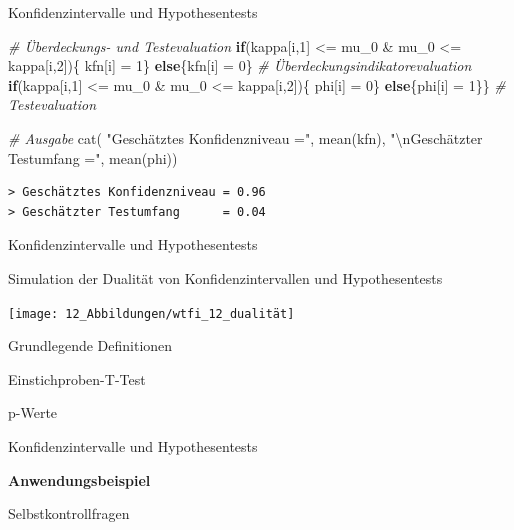 \documentclass[
  8pt,
  ignorenonframetext,
]{beamer}
\newenvironment{Shaded}{\begin{snugshade}}{\end{snugshade}}
\newcommand{\CommentTok}[1]{\textcolor[rgb]{0.56,0.35,0.01}{\textit{#1}}}
\newcommand{\ControlFlowTok}[1]{\textcolor[rgb]{0.13,0.29,0.53}{\textbf{#1}}}
\newcommand{\DecValTok}[1]{\textcolor[rgb]{0.00,0.00,0.81}{#1}}
\newcommand{\FunctionTok}[1]{\textcolor[rgb]{0.00,0.00,0.00}{#1}}
\newcommand{\NormalTok}[1]{#1}
\newcommand{\OtherTok}[1]{\textcolor[rgb]{0.56,0.35,0.01}{#1}}
\newcommand{\SpecialCharTok}[1]{\textcolor[rgb]{0.00,0.00,0.00}{#1}}
\newcommand{\StringTok}[1]{\textcolor[rgb]{0.31,0.60,0.02}{#1}}
\begin{document}
\begin{frame}[fragile]{Konfidenzintervalle und Hypothesentests}
\begin{Shaded}
\begin{Highlighting}[]
  \CommentTok{\# Überdeckungs{-} und Testevaluation}
  \ControlFlowTok{if}\NormalTok{(kappa[i,}\DecValTok{1}\NormalTok{] }\SpecialCharTok{\textless{}=}\NormalTok{ mu\_0 }\SpecialCharTok{\&}\NormalTok{ mu\_0 }\SpecialCharTok{\textless{}=}\NormalTok{ kappa[i,}\DecValTok{2}\NormalTok{])\{}
\NormalTok{      kfn[i] }\OtherTok{=} \DecValTok{1}\NormalTok{\} }\ControlFlowTok{else}\NormalTok{\{kfn[i] }\OtherTok{=} \DecValTok{0}\NormalTok{\}                    }\CommentTok{\# Überdeckungsindikatorevaluation}
  \ControlFlowTok{if}\NormalTok{(kappa[i,}\DecValTok{1}\NormalTok{] }\SpecialCharTok{\textless{}=}\NormalTok{ mu\_0 }\SpecialCharTok{\&}\NormalTok{ mu\_0 }\SpecialCharTok{\textless{}=}\NormalTok{ kappa[i,}\DecValTok{2}\NormalTok{])\{}
\NormalTok{      phi[i] }\OtherTok{=} \DecValTok{0}\NormalTok{\} }\ControlFlowTok{else}\NormalTok{\{phi[i] }\OtherTok{=} \DecValTok{1}\NormalTok{\}\}                    }\CommentTok{\# Testevaluation}

\CommentTok{\# Ausgabe}
\FunctionTok{cat}\NormalTok{(   }\StringTok{"Geschätztes Konfidenzniveau ="}\NormalTok{, }\FunctionTok{mean}\NormalTok{(kfn),}
     \StringTok{"}\SpecialCharTok{\textbackslash{}n}\StringTok{Geschätzter Testumfang      ="}\NormalTok{, }\FunctionTok{mean}\NormalTok{(phi))}
\end{Highlighting}
\end{Shaded}

\begin{verbatim}
> Geschätztes Konfidenzniveau = 0.96 
> Geschätzter Testumfang      = 0.04
\end{verbatim}
\end{frame}

\begin{frame}{Konfidenzintervalle und Hypothesentests}
\protect\hypertarget{konfidenzintervalle-und-hypothesentests-3}{}
\vspace{1mm}

Simulation der Dualität von Konfidenzintervallen und Hypothesentests
\vspace{1mm}

\begin{center}\texttt{[image: 12\_Abbildungen/wtfi\_12\_dualität]} \end{center}
\end{frame}

\begin{frame}{}
\protect\hypertarget{section-11}{}
\large
\vfill

Grundlegende Definitionen

Einstichproben-T-Test

p-Werte

Konfidenzintervalle und Hypothesentests

\textbf{Anwendungsbeispiel}

Selbstkontrollfragen \vfill
\end{frame}
\end{document}
